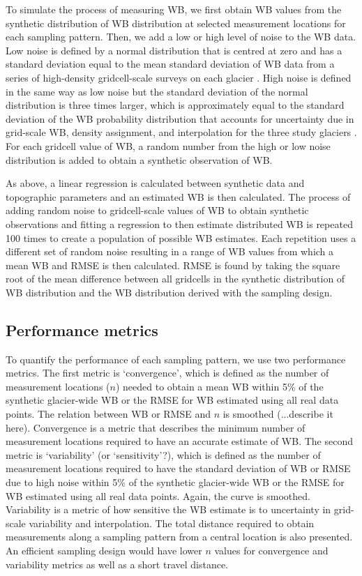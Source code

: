 \documentclass[twocolumn,letterpaper]{igs}
\begin{document}
To simulate the process of measuring WB, we first obtain WB values from the synthetic distribution of WB distribution at selected measurement locations for each sampling pattern. Then, we add a low or high level of noise to the WB data. Low noise is defined by a normal distribution that is centred at zero and has a standard deviation equal to the mean standard deviation of WB data from a series of high-density gridcell-scale surveys on each glacier \citep{Pulwicki2017}. High noise is defined in the same way as low noise but the standard deviation of the normal distribution is three times larger, which is approximately equal to the standard deviation of the WB probability distribution that accounts for uncertainty due in grid-scale WB, density assignment, and interpolation for the three study glaciers \citep{Pulwicki2017}. For each gridcell value of WB, a random number from the high or low noise distribution is added to obtain a synthetic observation of WB.

As above, a linear regression is calculated between synthetic data and topographic parameters and an estimated WB is then calculated. The process of adding random noise to gridcell-scale values of WB to obtain synthetic observations and fitting a regression to then estimate distributed WB is repeated 100 times to create a population of possible WB estimates. Each repetition uses a different set of random noise resulting in a range of WB values from which a mean WB and RMSE is then calculated. RMSE is found by taking the square root of the mean difference between all gridcells in the synthetic distribution of WB distribution and the WB distribution derived with the sampling design.
 
 \subsection{Performance metrics}
 
To quantify the performance of each sampling pattern, we use two performance metrics. The first metric is `convergence', which is defined as the number of measurement locations ($n$) needed to obtain a mean WB within 5\% of the synthetic glacier-wide WB or the RMSE for WB estimated using all real data points. The relation between WB or RMSE and $n$ is smoothed (...describe it here). Convergence is a metric that describes the minimum number of measurement locations required to have an accurate estimate of WB. The second metric is `variability' (or `sensitivity'?), which is defined as the number of measurement locations required to have the standard deviation of WB or RMSE due to high noise within 5\% of the synthetic glacier-wide WB or the RMSE for WB estimated using all real data points. Again, the curve is smoothed. Variability is a metric of how sensitive the WB estimate is to uncertainty in grid-scale variability and interpolation. The total distance required to obtain measurements along a sampling pattern from a central location is also presented. An efficient sampling design would have lower $n$ values for convergence and variability metrics as well as a short travel distance. 
\end{document}
